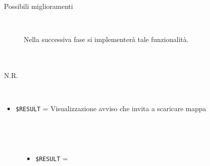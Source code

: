\documentclass[../../SperimentazioniPratiche.tex]{subfiles}
\begin{document}
\begin{tcolorbox}[fonttitle=\bfseries, 
								adjusted title={\Large Prova 6A.1}, 
								breakable, 
								sharp corners=south,
								colback=white, 
								colframe=white!60!black]
\begin{description}[leftmargin=0.7cm,labelwidth=!]
\begin{description}
        					\item[Possibili miglioramenti] \ \par 
        						Nella successiva fase si implementerà tale funzionalità.
        				\end{description}
        				
				\end{description}  
				
			\end{tcolorbox}



	
	\newpage	
			\paragraph*{}	
			\label{Prova7A.1}
			\begin{tcolorbox}[fonttitle=\bfseries, 
								adjusted title={\Large Prova 7A.1}, 
								breakable, 
								sharp corners=south,
								colback=white, 
								colframe=white!60!black]
								
				\begin{description}[leftmargin=0.7cm,labelwidth=!]
				
					\item[Input] \ \par 
        				N.R.
        				
        			\tcbline 
        				
        			\item[Output atteso] \ \par
        				\begin{itemize}
        					\item \verb|$RESULT| = Visualizzazione avviso che invita a scaricare mappa
        				\end{itemize}

					\tcbline        				
        				
        			\item[Output riscontrato] \ \par
        				\begin{description}
        				
        					\item[\dispositivoA] \ \par
        					\begin{itemize}
        						\item \verb|$RESULT| = \ok
        					\end{itemize}      					
        					

\end{description}
\end{description}
\end{tcolorbox}
\end{document}
